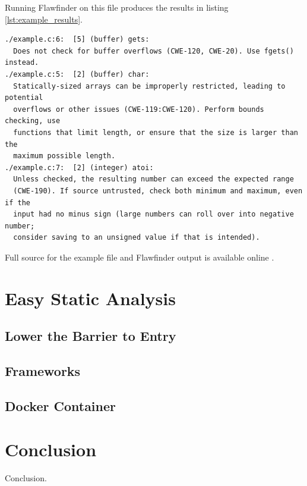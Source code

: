 \documentclass[journal]{IEEEtran}
\begin{document}
Running Flawfinder on this file produces the results in listing \ref{lst:example_results}.

\begin{lstlisting}[caption=Example Flawfinder Results, label=lst:example_results]
./example.c:6:  [5] (buffer) gets:
  Does not check for buffer overflows (CWE-120, CWE-20). Use fgets() instead.
./example.c:5:  [2] (buffer) char:
  Statically-sized arrays can be improperly restricted, leading to potential
  overflows or other issues (CWE-119:CWE-120). Perform bounds checking, use
  functions that limit length, or ensure that the size is larger than the
  maximum possible length.
./example.c:7:  [2] (integer) atoi:
  Unless checked, the resulting number can exceed the expected range
  (CWE-190). If source untrusted, check both minimum and maximum, even if the
  input had no minus sign (large numbers can roll over into negative number;
  consider saving to an unsigned value if that is intended).
\end{lstlisting}

Full source for the example file and Flawfinder output is available online \cite{this_repo}.

\section{Easy Static Analysis}

\subsection{Lower the Barrier to Entry}

\subsection{Frameworks}

\subsection{Docker Container}


\section{Conclusion}
Conclusion.


\end{document}
